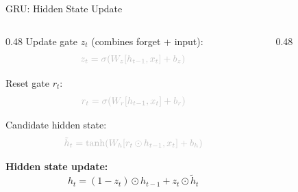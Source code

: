 \begin{frame}{GRU: Hidden State Update}
  \begin{columns}[T]
    \begin{column}{0.48\textwidth}
      \textcolor{gray!50}{Update gate $z_t$ (combines forget + input):}
      \[
        \textcolor{gray!50}{z_t = \sigma\!\left(W_z [h_{t-1}, x_t] + b_z\right)}
      \]

      \textcolor{gray!50}{Reset gate $r_t$:}
      \[
        \textcolor{gray!50}{r_t = \sigma\!\left(W_r [h_{t-1}, x_t] + b_r\right)}
      \]

      \textcolor{gray!50}{Candidate hidden state:}
      \[
        \textcolor{gray!50}{\tilde{h}_t = \tanh\!\left(W_h [r_t \odot h_{t-1}, x_t] + b_h\right)}
      \]

      \textbf{Hidden state update:}
      \[
        \boxed{h_t = (1 - z_t) \odot h_{t-1} + z_t \odot \tilde{h}_t}
      \]
    \end{column}
    \begin{column}{0.48\textwidth}
      \begin{center}
      \end{center}
    \end{column}
  \end{columns}
\end{frame}

